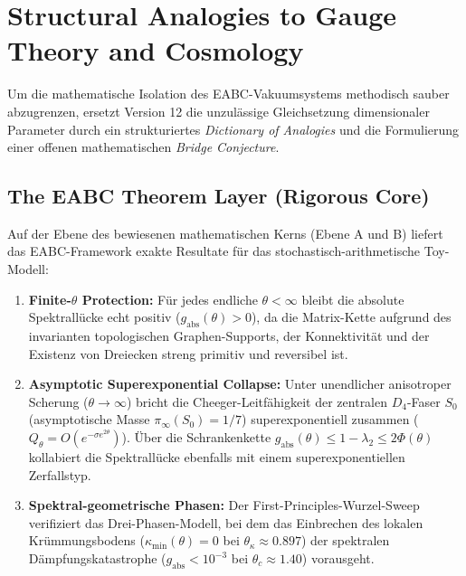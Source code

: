 \documentclass[11pt,a4paper]{article}
\begin{document}
	\section{Structural Analogies to Gauge Theory and Cosmology}
	Um die mathematische Isolation des EABC-Vakuumsystems methodisch sauber abzugrenzen, ersetzt Version 12 die unzulässige Gleichsetzung dimensionaler Parameter durch ein strukturiertes \textit{Dictionary of Analogies} und die Formulierung einer offenen mathematischen \textit{Bridge Conjecture}.
	
	\subsection{The EABC Theorem Layer (Rigorous Core)}
	Auf der Ebene des bewiesenen mathematischen Kerns (Ebene A und B) liefert das EABC-Framework exakte Resultate für das stochastisch-arithmetische Toy-Modell:
	\begin{enumerate}
		\item \textbf{Finite-$\theta$ Protection:} Für jedes endliche $\theta < \infty$ bleibt die absolute Spektrallücke echt positiv ($g_{\text{abs}}(\theta) > 0$), da die Matrix-Kette aufgrund des invarianten topologischen Graphen-Supports, der Konnektivität und der Existenz von Dreiecken streng primitiv und reversibel ist.
		\item \textbf{Asymptotic Superexponential Collapse:} Unter unendlicher anisotroper Scherung ($\theta \to \infty$) bricht die Cheeger-Leitfähigkeit der zentralen $D_4$-Faser $S_0$ (asymptotische Masse $\pi_\infty(S_0) = 1/7$) superexponentiell zusammen ($Q_\theta = O(e^{-\sigma e^{2\theta}})$). Über die Schrankenkette $g_{\text{abs}}(\theta) \le 1 - \lambda_2 \le 2\Phi(\theta)$ kollabiert die Spektrallücke ebenfalls mit einem superexponentiellen Zerfallstyp.
		\item \textbf{Spektral-geometrische Phasen:} Der First-Principles-Wurzel-Sweep verifiziert das Drei-Phasen-Modell, bei dem das Einbrechen des lokalen Krümmungsbodens ($\kappa_{\min}(\theta) = 0$ bei $\theta_\kappa \approx 0.897$) der spektralen Dämpfungskatastrophe ($g_{\text{abs}} < 10^{-3}$ bei $\theta_c \approx 1.40$) vorausgeht.
	\end{enumerate}
	
\end{document}
